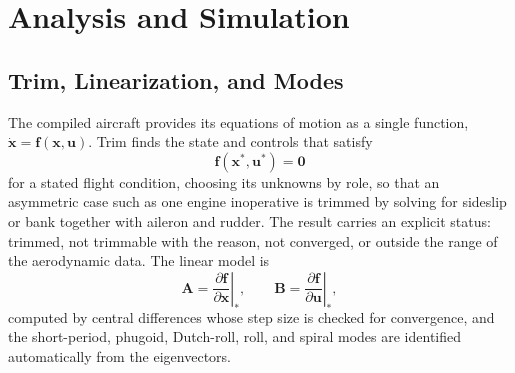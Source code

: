 \documentclass[conf]{new-aiaa}
\newcommand{\vect}[1]{\mathbf{#1}}
\begin{document}
\section{Analysis and Simulation}
\subsection{Trim, Linearization, and Modes}
The compiled aircraft provides its equations of motion as a single function,
$\dot{\vect{x}} = \vect{f}(\vect{x}, \vect{u})$. Trim finds the state and controls that satisfy
\begin{equation}
\label{eq:trim}
\vect{f}(\vect{x}^\ast, \vect{u}^\ast) = \vect{0}
\end{equation}
for a stated flight condition, choosing its unknowns by role, so that an asymmetric case such
as one engine inoperative is trimmed by solving for sideslip or bank together with aileron and
rudder. The result carries an explicit status: trimmed, not trimmable with the reason, not
converged, or outside the range of the aerodynamic data. The linear model is
\begin{equation}
\label{eq:lin}
\vect{A} = \left.\frac{\partial \vect{f}}{\partial \vect{x}}\right|_{\ast}, \qquad
\vect{B} = \left.\frac{\partial \vect{f}}{\partial \vect{u}}\right|_{\ast},
\end{equation}
computed by central differences whose step size is checked for convergence, and the
short-period, phugoid, Dutch-roll, roll, and spiral modes are identified automatically from
the eigenvectors.
\end{document}
